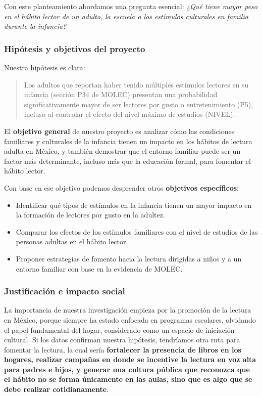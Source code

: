 \documentclass[aps,reprint]{revtex4-2}
\begin{document}
Con este planteamiento abordamos una pregunta esencial: \textit{¿Qué tiene mayor peso en el hábito lector de un adulto, la escuela o los estímulos culturales en familia durante la infancia?}  

\subsubsection{Hipótesis y objetivos del proyecto}
Nuestra hipótesis es clara: 
\begin{quote}
Los adultos que reportan haber tenido múltiples estímulos lectores en su infancia (sección P34 de MOLEC) presentan una probabilidad significativamente mayor de ser lectores por gusto o entretenimiento (P5), incluso al controlar el efecto del nivel máximo de estudios (NIVEL).
\end{quote}  

El \textbf{objetivo general} de nuestro proyecto es analizar cómo las condiciones familiares y culturales de la infancia tienen un impacto en los hábitos de lectura adulta en México, y también demostrar que el entorno familiar puede ser un factor más determinante, incluso más que la educación formal, para fomentar el hábito lector.  

Con base en ese objetivo podemos desprender otros \textbf{objetivos específicos}:  
\begin{itemize}
    \item Identificar qué tipos de estímulos en la infancia tienen un mayor impacto en la formación de lectores por gusto en la adultez.  
    \item Comparar los efectos de los estímulos familiares con el nivel de estudios de las personas adultas en el hábito lector.  
    \item Proponer estrategias de fomento hacia la lectura dirigidas a niños y a un entorno familiar con base en la evidencia de MOLEC.  
\end{itemize}  

\subsubsection{Justificación e impacto social}
La importancia de nuestra investigación empieza por la promoción de la lectura en México, porque siempre ha estado enfocada en programas escolares, olvidando el papel fundamental del hogar, considerado como un espacio de iniciación cultural. Si los datos confirman nuestra hipótesis, tendríamos otra ruta para fomentar la lectura, la cual sería \textbf{fortalecer la presencia de libros en los hogares, realizar campañas en donde se incentive la lectura en voz alta para padres e hijos, y generar una cultura pública que reconozca que el hábito no se forma únicamente en las aulas, sino que es algo que se debe realizar cotidianamente}.  
 
\end{document}
